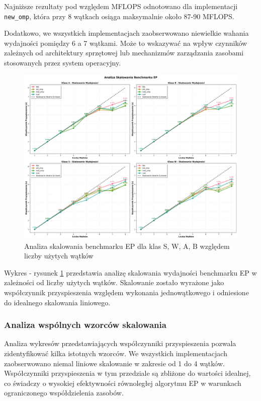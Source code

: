 Najniższe rezultaty pod względem MFLOPS odnotowano dla implementacji \texttt{new\_omp}, która przy 8 wątkach osiąga maksymalnie około 87-90 MFLOPS.

Dodatkowo, we wszystkich implementacjach zaobserwowano niewielkie wahania wydajności pomiędzy 6 a 7 wątkami. Może to wskazywać na wpływ czynników zależnych od architektury sprzętowej lub mechanizmów zarządzania zasobami stosowanych przez system operacyjny.

\begin{figure}[H]
    \centering
    \includegraphics[width=\textwidth]{analiza/images/parallel/ep/x86/ep_analiza_skalowania.png}
    \caption{Analiza skalowania benchmarku EP dla klas S, W, A, B względem liczby użytych wątków}
    \label{ep_analiza_skalowania_x86_64}
\end{figure}
Wykres - rysunek \ref{ep_analiza_skalowania_x86_64} przedstawia analizę skalowania wydajności benchmarku EP w zależności od liczby użytych wątków. Skalowanie zostało wyrażone jako współczynnik przyspieszenia względem wykonania jednowątkowego i odniesione do idealnego skalowania liniowego.

\subsubsection{Analiza wspólnych wzorców skalowania}
Analiza wykresów przedstawiających współczynniki przyspieszenia pozwala zidentyfikować kilka istotnych wzorców. We wszystkich implementacjach zaobserwowano niemal liniowe skalowanie w zakresie od 1 do 4 wątków. Współczynniki przyspieszenia w tym przedziale są zbliżone do wartości idealnej, co świadczy o wysokiej efektywności równoległej algorytmu EP w warunkach ograniczonego współdzielenia zasobów.

